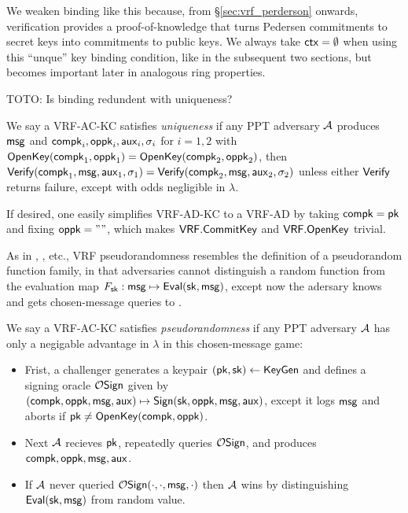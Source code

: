 We weaken binding like this because, from \S\ref{sec:vrf_perderson}
onwards, verification provides a proof-of-knowledge that turns
Pedersen commitments to secret keys into commitments to public keys.
We always take $\mathsf{ctx} = \emptyset$ when using this ``unque'' key binding
condition, like in the subsequent two sections, but
 \ctx becomes important later in analogous ring properties.

TOTO: Is binding redundent with uniqueness?

\begin{definition}
We say a VRF-AC-KC satisfies {\em uniqueness} if any PPT adversary $\mathcal{A}$
produces $\mathsf{msg}$ and $\mathsf{compk}_i,\mathsf{oppk}_i,\mathsf{aux}_i,\sigma_i$ for $i=1,2$
 with ${\mathsf{OpenKey}}(\mathsf{compk}_1,\mathsf{oppk}_1) = {\mathsf{OpenKey}}(\mathsf{compk}_2,\mathsf{oppk}_2)$, then
${\mathsf{Verify}}(\mathsf{compk}_1,\mathsf{msg},\mathsf{aux}_1,\sigma_1) = {\mathsf{Verify}}(\mathsf{compk}_2,\mathsf{msg},\mathsf{aux}_2,\sigma_2)$
unless either ${\mathsf{Verify}}$ returns failure,
except with odds negligible in $\lambda$.
\end{definition}

If desired, one easily simplifies VRF-AD-KC to a VRF-AD by
 taking $\mathsf{compk} = \mathsf{pk}$ and fixing $\mathsf{oppk} = \mathtt{""}$,
 which makes ${\mathsf{VRF}}.{\mathsf{CommitKey}}$ and ${\mathsf{VRF}}.{\mathsf{OpenKey}}$ trivial.

As in \cite{vrf_micali}, \cite{agg_dkg}, etc., VRF pseudorandomness
resembles the definition of a pseudorandom function family, in that
adversaries cannot distinguish a random function from the evaluation
map $F_\mathsf{sk} : \mathsf{msg} \mapsto {\ensuremath{\mathsf{Eval}}}(\mathsf{sk},\mathsf{msg})$,
except now the adersary knows \pk and gets chosen-message queries to \Sign.

\begin{definition}
We say a VRF-AC-KC satisfies {\em pseudorandomness} if 
any PPT adversary $\mathcal{A}$ has only a negigable advantage in $\lambda$
in this chosen-message game:
\begin{itemize}
 \item Frist, a challenger
  generates a keypair $(\mathsf{pk},\mathsf{sk}) \leftarrow {\ensuremath{\mathsf{KeyGen}}}$ and
  defines a signing oracle $\mathcal{O}\mathsf{Sign}$ given by
  $(\mathsf{compk},\mathsf{oppk},\mathsf{msg},\mathsf{aux}) \mapsto {\ensuremath{\mathsf{Sign}}}(\mathsf{sk},\mathsf{oppk},\mathsf{msg},\mathsf{aux})$,
   except it logs $\mathsf{msg}$ and aborts if $\mathsf{pk} \ne {\ensuremath{\mathsf{OpenKey}}}(\mathsf{compk},\mathsf{oppk})$.
 \item Next $\mathcal{A}$ recieves $\mathsf{pk}$, repeatedly queries $\mathcal{O}\mathsf{Sign}$,
  and produces $\mathsf{compk},\mathsf{oppk},\mathsf{msg},\mathsf{aux}$. 
 \item If $\mathcal{A}$ never queried $\mathcal{O}\mathsf{Sign}(\cdot,\cdot,\mathsf{msg},\cdot)$ then
  $\mathcal{A}$ wins by distinguishing ${\mathsf{Eval}}(\mathsf{sk},\mathsf{msg})$ from random value.
\end{itemize}
\end{definition}

